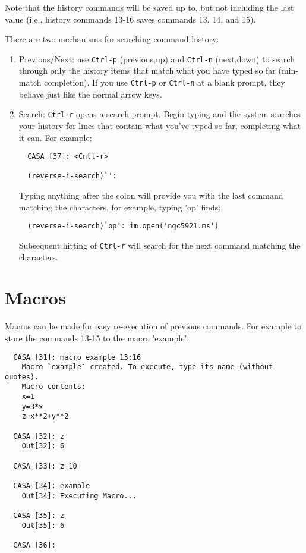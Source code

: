 Note that the history commands will be saved up to, but not including
the last value (i.e., history commands 13-16 saves commands 13, 14,
and 15). 

There are two mechanisms for searching command history:
\begin{enumerate}
\item Previous/Next: use {\tt Ctrl-p} (previous,up) and {\tt Ctrl-n}
(next,down) to search through only the history items that match what
you have typed so far (min-match completion). If 
you use {\tt Ctrl-p} or {\tt Ctrl-n} at a blank prompt, they behave just
like the normal arrow keys.

\item Search: {\tt Ctrl-r} opens a search prompt. Begin typing and the
system searches your history for lines that contain what you've typed
so far, completing what it can.   For example:
\small
\begin{verbatim}
  CASA [37]: <Cntl-r>

  (reverse-i-search)`':
\end{verbatim}
\normalsize
Typing anything after the colon will provide you with the
last command matching the characters, for example, typing
'op' finds:
\small
\begin{verbatim}
  (reverse-i-search)`op': im.open('ngc5921.ms')
\end{verbatim}
\normalsize
Subsequent hitting of {\tt Ctrl-r} will search for the next
command matching the characters. 

\end{enumerate}

\section{Macros}
\label{section:python.macros}

Macros can be made for easy re-execution of previous commands. For
example to store the commands 13-15 to the macro 'example': 

\small
\begin{verbatim}
  CASA [31]: macro example 13:16
    Macro `example` created. To execute, type its name (without quotes).
    Macro contents:
    x=1
    y=3*x
    z=x**2+y**2

  CASA [32]: z
    Out[32]: 6

  CASA [33]: z=10

  CASA [34]: example
    Out[34]: Executing Macro...

  CASA [35]: z
    Out[35]: 6

  CASA [36]:
\end{verbatim}
\normalsize


